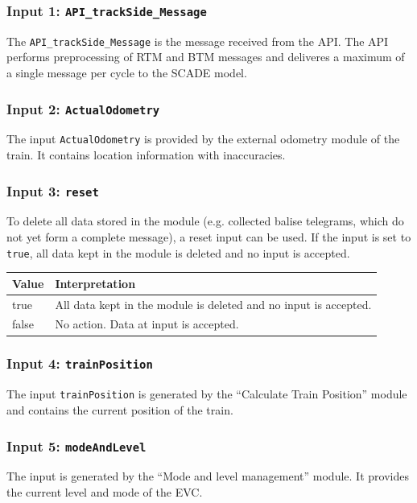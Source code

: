 \subsubsection{Input 1: \texttt{API\_trackSide\_Message}}
The \texttt{API\_trackSide\_Message} is the message received from the API. The API performs preprocessing of RTM and BTM messages and deliveres a maximum of a single message per cycle to the SCADE model.

\subsubsection{Input 2: \texttt{ActualOdometry}}
The input \texttt{ActualOdometry} is provided by the external odometry module of the train. It contains location information with inaccuracies.

\subsubsection{Input 3: \texttt{reset}}
To delete all data stored in the module (e.g. collected balise telegrams, which do not yet form a complete message), a reset input can be used. If the input is set to \texttt{true}, all data kept in the module is deleted and no input is accepted.

\begin{minipage}{\linewidth}
   \begin{tabular}{| l | p{9cm} |}
    \hline
    \textbf{Value} & \textbf{Interpretation}\\ \hline
    true & All data kept in the module is deleted and no input is accepted.\\
    false & No action. Data at input is accepted.\\
    \hline
  \end{tabular} 
  \label{tbl:reset}
\end{minipage}


\subsubsection{Input 4: \texttt{trainPosition}}
The input \texttt{trainPosition} is generated by the ``Calculate Train Position'' module and contains the current position of the train.

\subsubsection{Input 5: \texttt{modeAndLevel}}
The input is generated by the ``Mode and level management'' module. It provides the current level and mode of the EVC.

